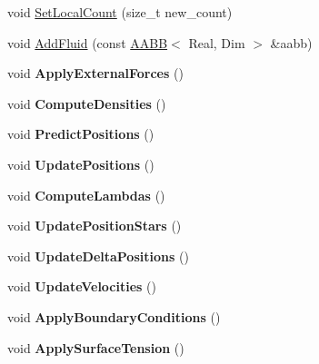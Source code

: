 \begin{DoxyCompactItemize}
\item 
void \hyperlink{classParticles_a4f97cccb8b8053908a98f021da02dff7}{Set\+Local\+Count} (size\+\_\+t new\+\_\+count)
\item 
void \hyperlink{classParticles_abd552dcb40fc97f97eac45cd0b4b32e5}{Add\+Fluid} (const \hyperlink{classAABB}{A\+A\+B\+B}$<$ Real, Dim $>$ \&aabb)
\item 
\hypertarget{classParticles_aa93c64b699001f08e876090b698e9a6e}{}void {\bfseries Apply\+External\+Forces} ()\label{classParticles_aa93c64b699001f08e876090b698e9a6e}

\item 
\hypertarget{classParticles_a8c1f87678adc3d4694989c4ad6bcfcac}{}void {\bfseries Compute\+Densities} ()\label{classParticles_a8c1f87678adc3d4694989c4ad6bcfcac}

\item 
\hypertarget{classParticles_a3d038a34c4ffc9c624e0b804f0857288}{}void {\bfseries Predict\+Positions} ()\label{classParticles_a3d038a34c4ffc9c624e0b804f0857288}

\item 
\hypertarget{classParticles_a685e6cb3322d28d75a89686bae94f56c}{}void {\bfseries Update\+Positions} ()\label{classParticles_a685e6cb3322d28d75a89686bae94f56c}

\item 
\hypertarget{classParticles_a7f2aa253f0f8ddaa8c196b4ed686b995}{}void {\bfseries Compute\+Lambdas} ()\label{classParticles_a7f2aa253f0f8ddaa8c196b4ed686b995}

\item 
\hypertarget{classParticles_a96b9ff0e28498df6175cc9f08ca7ac45}{}void {\bfseries Update\+Position\+Stars} ()\label{classParticles_a96b9ff0e28498df6175cc9f08ca7ac45}

\item 
\hypertarget{classParticles_ae186de8b5998f9649079ccbfd993ff7c}{}void {\bfseries Update\+Delta\+Positions} ()\label{classParticles_ae186de8b5998f9649079ccbfd993ff7c}

\item 
\hypertarget{classParticles_a5bbe5eeb65b2a607fa09c20c5c6ffb2b}{}void {\bfseries Update\+Velocities} ()\label{classParticles_a5bbe5eeb65b2a607fa09c20c5c6ffb2b}

\item 
\hypertarget{classParticles_a0286e53acd9d1bf2b305ab2e79a64106}{}void {\bfseries Apply\+Boundary\+Conditions} ()\label{classParticles_a0286e53acd9d1bf2b305ab2e79a64106}

\item 
\hypertarget{classParticles_a1f6ff2cbc6c7fc6d28b2849f94d72dab}{}void {\bfseries Apply\+Surface\+Tension} ()\label{classParticles_a1f6ff2cbc6c7fc6d28b2849f94d72dab}


\end{DoxyCompactItemize}
